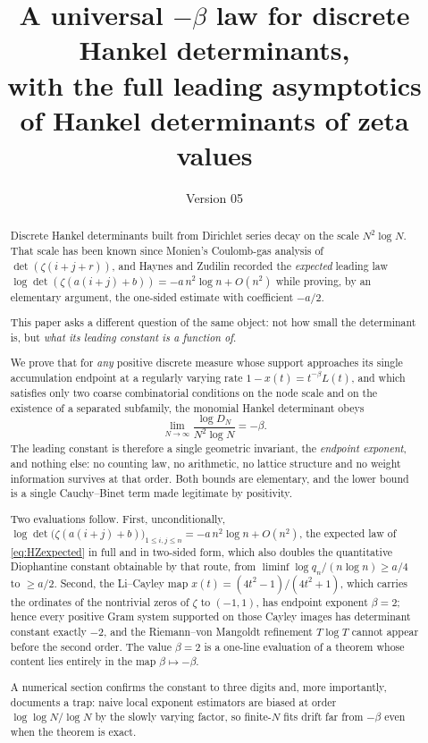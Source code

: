\documentclass[11pt]{amsart}
\title[A universal $-\beta$ law]{A universal $-\beta$ law for discrete Hankel determinants,\\
with the full leading asymptotics\\
of Hankel determinants of zeta values}
\author{}
\date{Version 05}
\numberwithin{equation}{section}
\theoremstyle{plain}
\theoremstyle{definition}
\theoremstyle{remark}
\begin{document}
\begin{abstract}
Discrete Hankel determinants built from Dirichlet series decay on the scale $N^{2}\log N$.
That scale has been known since Monien's Coulomb-gas analysis of $\det(\zeta(i+j+r))$, and
Haynes and Zudilin recorded the \emph{expected} leading law
$\log\det(\zeta(a(i+j)+b))=-a\,n^{2}\log n+O(n^{2})$ while proving, by an elementary argument, the
one-sided estimate with coefficient $-a/2$.

This paper asks a different question of the same object: not how small the determinant is, but
\emph{what its leading constant is a function of}.

We prove that for \emph{any} positive discrete measure whose support approaches its single
accumulation endpoint at a regularly varying rate
$1-x(t)=t^{-\beta}L(t)$, and which satisfies only two coarse combinatorial conditions on the
node scale and on the existence of a separated subfamily, the monomial Hankel determinant obeys
\[
\lim_{N\to\infty}\frac{\log D_{N}}{N^{2}\log N}=-\beta .
\]
The leading constant is therefore a single geometric invariant, the \emph{endpoint exponent},
and nothing else: no counting law, no arithmetic, no lattice structure and no weight
information survives at that order. Both bounds are elementary, and the lower bound is a single
Cauchy--Binet term made legitimate by positivity.

Two evaluations follow. First, unconditionally,
$\log\det\bigl(\zeta(a(i+j)+b)\bigr)_{1\le i,j\le n}=-a\,n^{2}\log n+O(n^{2})$, the expected law of
\eqref{eq:HZexpected} in full and in two-sided form, which also doubles the quantitative Diophantine
constant obtainable by that route, from $\liminf\log q_{n}/(n\log n)\ge a/4$ to $\ge a/2$.
Second, the Li--Cayley
map $x(t)=(4t^{2}-1)/(4t^{2}+1)$, which carries the ordinates of the nontrivial zeros of $\zeta$
to $(-1,1)$, has endpoint exponent $\beta=2$; hence every positive Gram system supported on those
Cayley images has determinant constant exactly $-2$, and the Riemann--von Mangoldt refinement
$T\log T$ cannot appear before the second order. The value $\beta=2$ is a one-line evaluation of a
theorem whose content lies entirely in the map $\beta\mapsto-\beta$.

A numerical section confirms the constant to three digits and, more importantly, documents a
trap: naive local exponent estimators are biased at order $\log\log N/\log N$ by the slowly
varying factor, so finite-$N$ fits drift far from $-\beta$ even when the theorem is exact.
\end{abstract}
\end{document}

